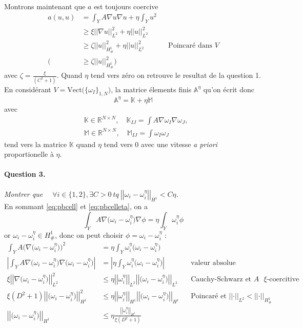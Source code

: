 \message{ !name(rapport.tex)}\documentclass[11pt]{article}
\newcommand{\Am}{\mathbb{A}}
\newcommand{\R}{\mathbb{R}}
\newcommand{\K}{\mathbb{K}}
\newcommand{\M}{\mathbb{M}}
\newcommand{\norm}[1]{\left|\left|#1\right|\right|}
\newcommand{\question}[2]{\paragraph{Question #1.}\textit{#2} \\}
\newcommand{\Hd}{H^1_{\#}}
\begin{document}
Montrons maintenant que $a$ est toujours coercive
\begin{align}
  \label{eq:co}
  a(u,u) &= \int_Y A \nabla u  \nabla u + \eta \int_Y u^2 \\
         &\geq \xi \norm{\nabla u}^2_{L^2} + \eta \norm{u}^2_{L^2} \\
         &\geq \zeta \norm{u}^2_{\Hd} + \eta \norm{ u}^2_{L^2} && \text{Poincaré dans }V\\
    \big(&\geq \zeta  \norm{u}^2_{\Hd}\big)
\end{align} 
avec $\zeta = \frac{\xi}{(C^2+1)}$. Quand $\eta$ tend vers zéro on retrouve le resultat de la question 1. En considérant $V = \text{Vect}\big(\{\omega_I\}_{1,N})$, la matrice élements finis $\Am^{\eta}$ qu'on écrit donc
\begin{equation}
  \Am^{\eta} = \K + \eta \M 
\end{equation}
avec
\begin{align}
  &\K \in \R^{N\times N},\quad \K_{IJ} = \int A \nabla \omega_I \nabla \omega_J,  \\
  &\M \in \R^{N\times N},\quad \M_{IJ} = \int \omega_I \omega_J
\end{align}
tend vers la matrice $\K$ quand $\eta$ tend vers $0$ avec une vitesse \emph{a priori} proportionelle à $\eta$.

\question{3}{Montrer que $\quad\forall i \in \{1,2\}, \exists C>0 ~tq~ \norm{\omega_i-\omega_i^\eta}_{H^1} < C \eta$.}
En sommant \autoref{eq:pbcell} et \autoref{eq:pbcelleta}, on a
\begin{equation}
  \int_Y A \nabla \big(\omega_i-\omega_i^\eta\big) \nabla \phi = \eta \int_Y \omega_i^\eta \phi
\end{equation}
or $\omega_i-\omega_i^\eta\in\Hd$, donc on peut choisir $\phi=\omega_i-\omega_i^\eta$ :
\begin{align}
  \int_Y A \big(\nabla \big(\omega_i-\omega_i^\eta\big)\big)^2
  &= \eta \int_Y \omega_i^\eta \big(\omega_i-\omega_i^\eta\big) \\
  \left| \int_Y A \nabla \big(\omega_i-\omega_i^\eta\big) \nabla \big(\omega_i-\omega_i^\eta\big) \right|
  &= \left| \eta \int_Y \omega_i^\eta \big(\omega_i-\omega_i^\eta\big) \right| && \text{valeur absolue} \\
  \xi \norm{\nabla \big(\omega_i-\omega_i^\eta \big)}_{L^2}^2
  &\leq \eta \norm{\omega_i^\eta}_{L^2} \norm{\big(\omega_i-\omega_i^\eta \big)}_{L^2} && \text{Cauchy-Schwarz et $A$ $\xi$-coercitive} \\
  \xi (D^2+1) \norm{\big(\omega_i-\omega_i^\eta \big)}_{H^1}^2 &\leq \eta \norm{\omega_i^\eta}_{H^1} \norm{\big(\omega_i-\omega_i^\eta \big)}_{H^1} && \text{Poincaré et }\norm{\cdot}_{L^2}<\norm{\cdot}_{\Hd} \\
  \norm{\big(\omega_i-\omega_i^\eta \big)}_{H^1} &\leq \eta \frac{\norm{\omega_i^\eta}_{H^1}}{\xi (D^2+1)}
\end{align}
\end{document}
